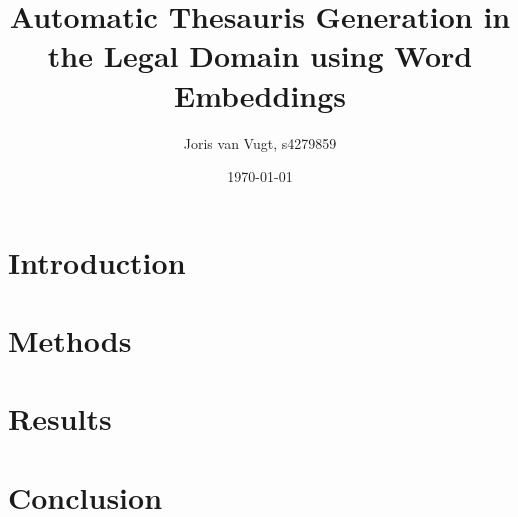 \documentclass{article}
\author{Joris van Vugt, s4279859}
\date{\today}
\title{Automatic Thesauris Generation in the Legal Domain using Word Embeddings}
\begin{document}
\maketitle
\begin{multicols}{2}
\section{Introduction}
\section{Methods}
\section{Results}
\section{Conclusion}



\end{multicols}
\end{document}

